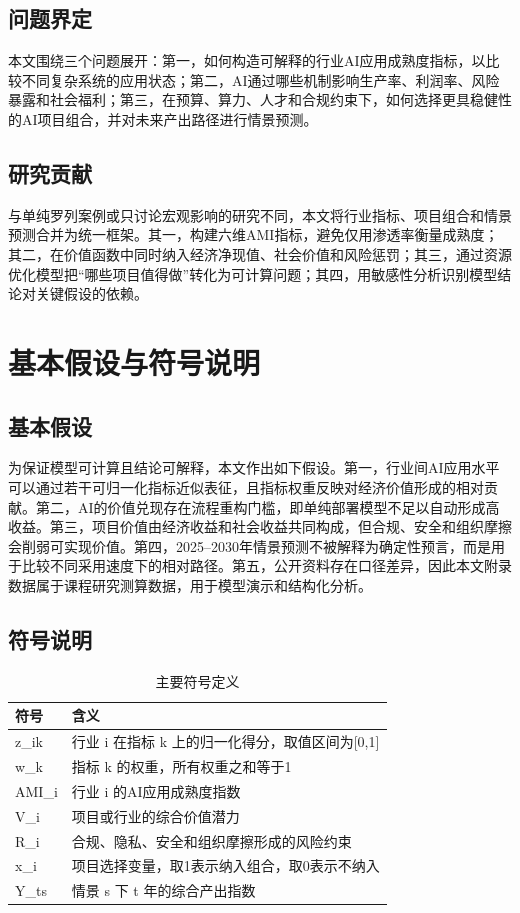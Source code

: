 \documentclass[UTF8,a4paper,12pt]{ctexart}
\begin{document}
\subsection{问题界定}
本文围绕三个问题展开：第一，如何构造可解释的行业AI应用成熟度指标，以比较不同复杂系统的应用状态；第二，AI通过哪些机制影响生产率、利润率、风险暴露和社会福利；第三，在预算、算力、人才和合规约束下，如何选择更具稳健性的AI项目组合，并对未来产出路径进行情景预测。

\subsection{研究贡献}
与单纯罗列案例或只讨论宏观影响的研究不同，本文将行业指标、项目组合和情景预测合并为统一框架。其一，构建六维AMI指标，避免仅用渗透率衡量成熟度；其二，在价值函数中同时纳入经济净现值、社会价值和风险惩罚；其三，通过资源优化模型把“哪些项目值得做”转化为可计算问题；其四，用敏感性分析识别模型结论对关键假设的依赖。

\section{基本假设与符号说明}
\subsection{基本假设}
为保证模型可计算且结论可解释，本文作出如下假设。第一，行业间AI应用水平可以通过若干可归一化指标近似表征，且指标权重反映对经济价值形成的相对贡献。第二，AI的价值兑现存在流程重构门槛，即单纯部署模型不足以自动形成高收益。第三，项目价值由经济收益和社会收益共同构成，但合规、安全和组织摩擦会削弱可实现价值。第四，2025--2030年情景预测不被解释为确定性预言，而是用于比较不同采用速度下的相对路径。第五，公开资料存在口径差异，因此本文附录数据属于课程研究测算数据，用于模型演示和结构化分析。

\subsection{符号说明}
\begin{table}[H]
\centering
\small
\renewcommand{\arraystretch}{1.18}
\begin{tabular}{p{} p{}}
\toprule
符号 & 含义 \\
\midrule
z\_ik & 行业 i 在指标 k 上的归一化得分，取值区间为[0,1] \\
w\_k & 指标 k 的权重，所有权重之和等于1 \\
AMI\_i & 行业 i 的AI应用成熟度指数 \\
V\_i & 项目或行业的综合价值潜力 \\
R\_i & 合规、隐私、安全和组织摩擦形成的风险约束 \\
x\_i & 项目选择变量，取1表示纳入组合，取0表示不纳入 \\
Y\_ts & 情景 s 下 t 年的综合产出指数 \\
\bottomrule
\end{tabular}
\caption{主要符号定义}
\label{tab:notation}
\end{table}
\end{document}
